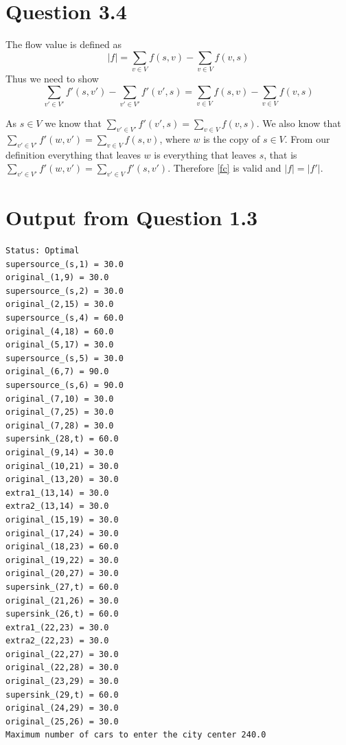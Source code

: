 \documentclass[10pt]{article}
\begin{document}
\section*{Question 3.4} %
\label{sec:question_3_4}
The flow value is defined as
\begin{equation}
 |f| = \sum_{v \in V} f(s,v) - \sum_{v \in V} f(v,s)
\end{equation}
Thus we need to show
\begin{equation}
  \sum_{v' \in V'} f'(s,v') - \sum_{v' \in V'} f'(v',s) =   \sum_{v \in V} f(s,v) - \sum_{v \in V} f(v,s) \label{fc}
\end{equation}

As $s \in V$ we know that $\sum_{v' \in V'} f'(v', s) = \sum_{v \in V} f(v, s)$.
We also know that $\sum_{v' \in V'} f'(w, v') = \sum_{v \in V} f(s, v)$, where $w$ is the copy of $s \in V$.
From our definition everything that leaves $w$ is everything that leaves $s$, that is $\sum_{v' \in V'} f'(w, v') = \sum_{v' \in V} f'(s, v')$.
Therefore \eqref{fc} is valid and $|f| = |f'|$.

% 



\appendix
\section{Output from Question 1.3} %
\label{sec:output_from_question_1_3}
\lstset{language=Python, basicstyle=\footnotesize, numbers=left, stepnumber=2, numberstyle=\tiny, frameround=tttt, frame=tlBR, captionpos=b}
\begin{lstlisting}
Status: Optimal
supersource_(s,1) = 30.0
original_(1,9) = 30.0
supersource_(s,2) = 30.0
original_(2,15) = 30.0
supersource_(s,4) = 60.0
original_(4,18) = 60.0
original_(5,17) = 30.0
supersource_(s,5) = 30.0
original_(6,7) = 90.0
supersource_(s,6) = 90.0
original_(7,10) = 30.0
original_(7,25) = 30.0
original_(7,28) = 30.0
supersink_(28,t) = 60.0
original_(9,14) = 30.0
original_(10,21) = 30.0
original_(13,20) = 30.0
extra1_(13,14) = 30.0
extra2_(13,14) = 30.0
original_(15,19) = 30.0
original_(17,24) = 30.0
original_(18,23) = 60.0
original_(19,22) = 30.0
original_(20,27) = 30.0
supersink_(27,t) = 60.0
original_(21,26) = 30.0
supersink_(26,t) = 60.0
extra1_(22,23) = 30.0
extra2_(22,23) = 30.0
original_(22,27) = 30.0
original_(22,28) = 30.0
original_(23,29) = 30.0
supersink_(29,t) = 60.0
original_(24,29) = 30.0
original_(25,26) = 30.0
Maximum number of cars to enter the city center 240.0
\end{lstlisting}
\end{document}

